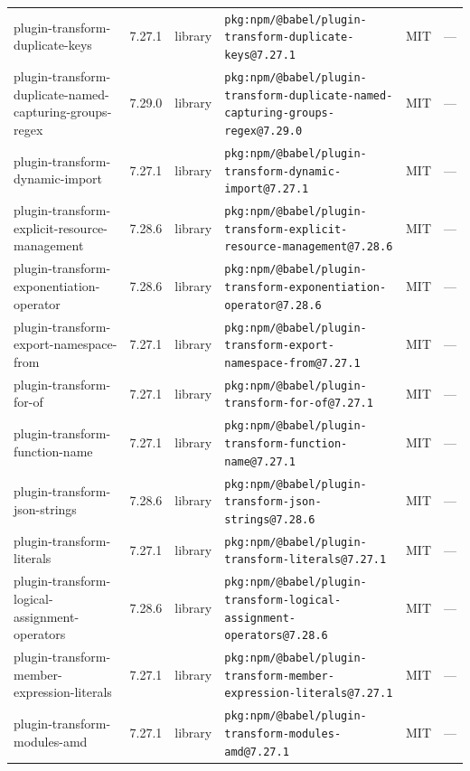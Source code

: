 \documentclass[11pt,a4paper]{article}
\begin{document}
\begin{longtable}{|p{4cm}|p{2cm}|p{1.6cm}|p{5cm}|p{1.5cm}|p{3.5cm}|}
\raggedright plugin-transform-duplicate-keys & 7.27.1 & library & \small\texttt{pkg:npm/@babel/plugin-transform-duplicate-keys@7.27.1} & MIT & \small — \\
\raggedright plugin-transform-duplicate-named-capturing-groups-regex & 7.29.0 & library & \small\texttt{pkg:npm/@babel/plugin-transform-duplicate-named-capturing-groups-regex@7.29.0} & MIT & \small — \\
\raggedright plugin-transform-dynamic-import & 7.27.1 & library & \small\texttt{pkg:npm/@babel/plugin-transform-dynamic-import@7.27.1} & MIT & \small — \\
\raggedright plugin-transform-explicit-resource-management & 7.28.6 & library & \small\texttt{pkg:npm/@babel/plugin-transform-explicit-resource-management@7.28.6} & MIT & \small — \\
\raggedright plugin-transform-exponentiation-operator & 7.28.6 & library & \small\texttt{pkg:npm/@babel/plugin-transform-exponentiation-operator@7.28.6} & MIT & \small — \\
\raggedright plugin-transform-export-namespace-from & 7.27.1 & library & \small\texttt{pkg:npm/@babel/plugin-transform-export-namespace-from@7.27.1} & MIT & \small — \\
\raggedright plugin-transform-for-of & 7.27.1 & library & \small\texttt{pkg:npm/@babel/plugin-transform-for-of@7.27.1} & MIT & \small — \\
\raggedright plugin-transform-function-name & 7.27.1 & library & \small\texttt{pkg:npm/@babel/plugin-transform-function-name@7.27.1} & MIT & \small — \\
\raggedright plugin-transform-json-strings & 7.28.6 & library & \small\texttt{pkg:npm/@babel/plugin-transform-json-strings@7.28.6} & MIT & \small — \\
\raggedright plugin-transform-literals & 7.27.1 & library & \small\texttt{pkg:npm/@babel/plugin-transform-literals@7.27.1} & MIT & \small — \\
\raggedright plugin-transform-logical-assignment-operators & 7.28.6 & library & \small\texttt{pkg:npm/@babel/plugin-transform-logical-assignment-operators@7.28.6} & MIT & \small — \\
\raggedright plugin-transform-member-expression-literals & 7.27.1 & library & \small\texttt{pkg:npm/@babel/plugin-transform-member-expression-literals@7.27.1} & MIT & \small — \\
\raggedright plugin-transform-modules-amd & 7.27.1 & library & \small\texttt{pkg:npm/@babel/plugin-transform-modules-amd@7.27.1} & MIT & \small — \\

\end{longtable}
\end{document}
